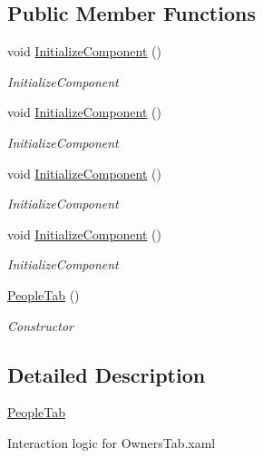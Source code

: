 \subsection*{Public Member Functions}
\begin{DoxyCompactItemize}
\item 
void \hyperlink{class_baudi_1_1_client_1_1_view_1_1_tabs_1_1_people_tab_abac4f938425feb5bd6b382d2d07e9b81}{Initialize\+Component} ()
\begin{DoxyCompactList}\small\item\em Initialize\+Component \end{DoxyCompactList}\item 
void \hyperlink{class_baudi_1_1_client_1_1_view_1_1_tabs_1_1_people_tab_abac4f938425feb5bd6b382d2d07e9b81}{Initialize\+Component} ()
\begin{DoxyCompactList}\small\item\em Initialize\+Component \end{DoxyCompactList}\item 
void \hyperlink{class_baudi_1_1_client_1_1_view_1_1_tabs_1_1_people_tab_abac4f938425feb5bd6b382d2d07e9b81}{Initialize\+Component} ()
\begin{DoxyCompactList}\small\item\em Initialize\+Component \end{DoxyCompactList}\item 
void \hyperlink{class_baudi_1_1_client_1_1_view_1_1_tabs_1_1_people_tab_abac4f938425feb5bd6b382d2d07e9b81}{Initialize\+Component} ()
\begin{DoxyCompactList}\small\item\em Initialize\+Component \end{DoxyCompactList}\item 
\hyperlink{class_baudi_1_1_client_1_1_view_1_1_tabs_1_1_people_tab_a5933ea94ec12459f9423c436330c5f00}{People\+Tab} ()
\begin{DoxyCompactList}\small\item\em Constructor \end{DoxyCompactList}\end{DoxyCompactItemize}


\subsection{Detailed Description}
\hyperlink{class_baudi_1_1_client_1_1_view_1_1_tabs_1_1_people_tab}{People\+Tab} 

Interaction logic for Owners\+Tab.\+xaml 

